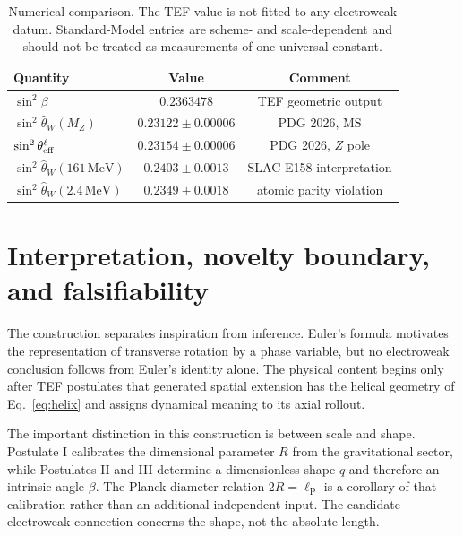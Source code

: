 \documentclass[aps,prd,reprint,nofootinbib,floatfix]{revtex4-2}
\begin{document}
\begin{table}[t]
\caption{Numerical comparison.  The TEF value is not fitted to any electroweak datum.  Standard-Model entries are scheme- and scale-dependent and should not be treated as measurements of one universal constant.}
\label{tab:compare}
\centering
\begin{ruledtabular}
\begin{tabular}{lcc}
Quantity & Value & Comment \\
\hline
$\sin^2\beta$ & $0.2363478$ & TEF geometric output \\
$\sin^2\widehat\theta_W(M_Z)$ & $0.23122\pm0.00006$ & PDG 2026, $\overline{\mathrm{MS}}$ \\
$\sin^2\theta_{\rm eff}^{\ell}$ & $0.23154\pm0.00006$ & PDG 2026, $Z$ pole \\
$\sin^2\widehat\theta_W(161\,\mathrm{MeV})$ & $0.2403\pm0.0013$ & SLAC E158 interpretation \\
$\sin^2\widehat\theta_W(2.4\,\mathrm{MeV})$ & $0.2349\pm0.0018$ & atomic parity violation \\
\end{tabular}
\end{ruledtabular}
\end{table}

\section{Interpretation, novelty boundary, and falsifiability}

The construction separates inspiration from inference.  Euler's formula motivates the representation of transverse rotation by a phase variable, but no electroweak conclusion follows from Euler's identity alone.  The physical content begins only after TEF postulates that generated spatial extension has the helical geometry of Eq.~\eqref{eq:helix} and assigns dynamical meaning to its axial rollout.

The important distinction in this construction is between scale and shape.  Postulate I calibrates the dimensional parameter $R$ from the gravitational sector, while Postulates II and III determine a dimensionless shape $q$ and therefore an intrinsic angle $\beta$.  The Planck-diameter relation $2R=\ell_{\mathrm P}$ is a corollary of that calibration rather than an additional independent input.  The candidate electroweak connection concerns the shape, not the absolute length.
\end{document}
